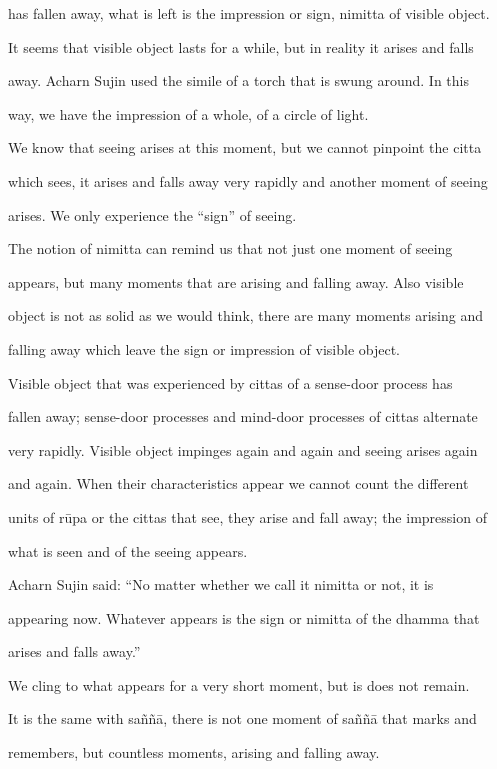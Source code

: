 has fallen away, what is left is the impression or sign, nimitta of visible object. 

   It seems that visible object lasts for a while, but in reality it arises and falls  

away. Acharn  Sujin  used  the  simile  of  a  torch that  is  swung  around.  In  this  

way, we have the impression of a whole, of a circle of light. 

   We know that seeing arises at this moment, but we cannot pinpoint the citta  

which sees, it arises and falls away very rapidly and another moment of seeing  

arises. We only experience the “sign” of seeing. 

   The  notion  of  nimitta  can  remind  us  that  not just   one  moment  of  seeing  

appears,  but  many  moments  that  are  arising  and  falling  away.  Also   visible  

object is not as solid as we would think, there are many moments arising and  

falling away which leave the sign or impression of visible object. 

   Visible  object  that  was   experienced  by  cittas  of  a  sense-door  process  has  

fallen away; sense-door processes and mind-door processes of cittas alternate  

very rapidly. Visible object impinges  again  and  again and  seeing  arises  again  

and  again. When  their  characteristics  appear we  cannot  count  the  different  

units of rūpa or the cittas that see, they arise and fall away; the impression of  

what is seen and of the seeing appears. 

   Acharn   Sujin   said:   “No   matter   whether   we   call   it   nimitta   or   not,   it   is  

appearing now. Whatever  appears  is the  sign or nimitta of the dhamma that  

arises and falls away.” 

   We cling to what appears for a very short moment, but is does not remain.  

It is the  same with  saññā, there is not one moment of  saññā that marks  and  

remembers, but countless moments, arising and falling away. 

